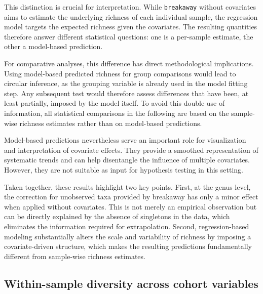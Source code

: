 This distinction is crucial for interpretation. While \texttt{breakaway} without covariates aims to estimate the underlying richness of each individual sample, the regression model targets the expected richness given the covariates. The resulting quantities therefore answer different statistical questions: one is a per-sample estimate, the other a model-based prediction.

For comparative analyses, this difference has direct methodological implications. Using model-based predicted richness for group comparisons would lead to circular inference, as the grouping variable is already used in the model fitting step. Any subsequent test would therefore assess differences that have been, at least partially, imposed by the model itself. To avoid this double use of information, all statistical comparisons in the following are based on the sample-wise richness estimates rather than on model-based predictions.

Model-based predictions nevertheless serve an important role for visualization and interpretation of covariate effects. They provide a smoothed representation of systematic trends and can help disentangle the influence of multiple covariates. However, they are not suitable as input for hypothesis testing in this setting.

Taken together, these results highlight two key points. First, at the genus level, the correction for unobserved taxa provided by breakaway has only a minor effect when applied without covariates. This is not merely an empirical observation but can be directly explained by the absence of singletons in the data, which eliminates the information required for extrapolation. Second, regression-based modeling substantially alters the scale and variability of richness by imposing a covariate-driven structure, which makes the resulting predictions fundamentally different from sample-wise richness estimates.

\subsection{Within-sample diversity across cohort variables}
\label{sec:7app:alpha:diversity_measures}

